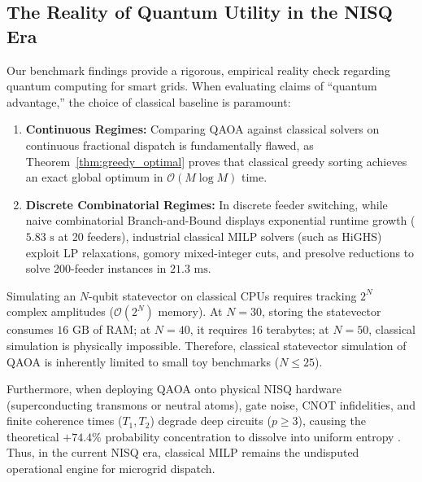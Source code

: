 \documentclass[11pt,a4paper]{article}
\theoremstyle{definition}
\theoremstyle{remark}
\begin{document}
\subsection{The Reality of Quantum Utility in the NISQ Era}
Our benchmark findings provide a rigorous, empirical reality check regarding quantum computing for smart grids. When evaluating claims of ``quantum advantage,'' the choice of classical baseline is paramount:
\begin{enumerate}
    \item \textbf{Continuous Regimes:} Comparing QAOA against classical solvers on continuous fractional dispatch is fundamentally flawed, as Theorem~\ref{thm:greedy_optimal} proves that classical greedy sorting achieves an exact global optimum in $\mathcal{O}(M \log M)$ time.
    \item \textbf{Discrete Combinatorial Regimes:} In discrete feeder switching, while naive combinatorial Branch-and-Bound displays exponential runtime growth ($5.83\text{ s}$ at 20 feeders), industrial classical MILP solvers (such as HiGHS) exploit LP relaxations, gomory mixed-integer cuts, and presolve reductions to solve 200-feeder instances in $21.3\text{ ms}$.
\end{enumerate}

Simulating an $N$-qubit statevector on classical CPUs requires tracking $2^N$ complex amplitudes ($\mathcal{O}(2^N)$ memory). At $N = 30$, storing the statevector consumes $16\text{ GB}$ of RAM; at $N = 40$, it requires 16 terabytes; at $N = 50$, classical simulation is physically impossible. Therefore, classical statevector simulation of QAOA is inherently limited to small toy benchmarks ($N \le 25$).

Furthermore, when deploying QAOA onto physical NISQ hardware (superconducting transmons or neutral atoms), gate noise, CNOT infidelities, and finite coherence times ($T_1, T_2$) degrade deep circuits ($p \ge 3$), causing the theoretical $+74.4\%$ probability concentration to dissolve into uniform entropy \cite{preskill2018}. Thus, in the current NISQ era, classical MILP remains the undisputed operational engine for microgrid dispatch.
\end{document}
